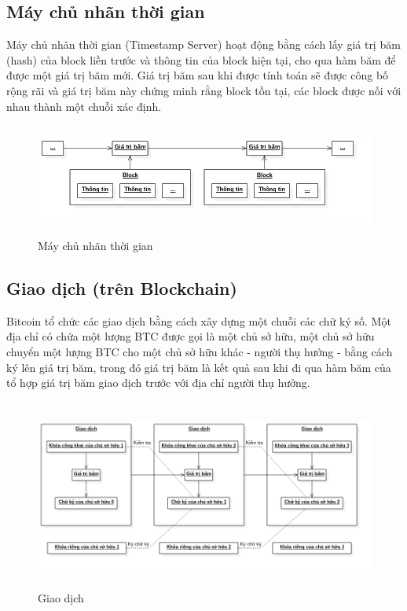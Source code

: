 \subsection{Máy chủ nhãn thời gian}
Máy chủ nhãn thời gian (Timestamp Server) hoạt động bằng cách lấy giá trị băm 
(hash) của block liền trước và thông tin của block hiện tại, cho qua hàm băm 
để được một giá trị băm mới. Giá trị băm sau khi được tính toán sẽ được công 
bố rộng rãi và giá trị băm này chứng minh rằng block tồn tại, các block được 
nối với nhau thành một chuỗi xác định.\\
\begin{figure}[h!]
\centering
\includegraphics[height=1.45in, keepaspectratio=true]{timestampserver.png}
\caption{Máy chủ nhãn thời gian}
\end{figure}
\subsection{Giao dịch (trên Blockchain)}
Bitcoin tổ chức các giao dịch bằng cách xây dựng một chuỗi các chữ ký số. Một 
địa chỉ có chứa một lượng BTC được gọi là một chủ sở hữu, một chủ sở hữu 
chuyển một lượng BTC cho một chủ sở hữu khác - người thụ hưởng - bằng cách ký 
lên giá trị băm, trong đó giá trị băm là kết quả sau khi đi qua hàm băm 
của tổ hợp giá trị băm giao dịch trước với địa chỉ người thụ hưởng.\\
\begin{figure}[h!]
\centering
\includegraphics[height=2.45in, keepaspectratio=true]{transaction.png}
\caption{Giao dịch}
\end{figure}
